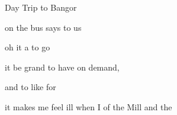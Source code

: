 \begin{SBSong}{Day Trip to Bangor}
\begin{SBVerse}
	 on the bus  says to us 
	
	oh  it a  to go
	
	 it be grand to have  on demand, 
	
	and to  like  for  
	
	 it makes me feel ill when I  of the Mill and the   
  \end{SBVerse}
\end{SBSong}
